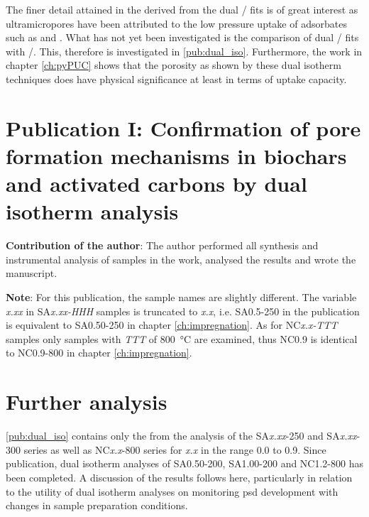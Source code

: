 The finer detail attained in the derived  from the dual / fits is of great interest as \glspl{ultramicropore} have been attributed to the low pressure uptake of \glspl{adsorbate} such as  and .\citep{Presser2011Effect, Sevilla2014Energy, Cabria2007optimum, DelaCasaLillo2002Hydrogen, Masika2012Hydrogen} What has not yet been investigated is the comparison of dual / fits with /. This, therefore is investigated in \ref{pub:dual_iso}. Furthermore, the work in chapter \ref{ch:pyPUC} shows that the porosity as shown by these dual isotherm techniques does have physical significance at least in terms of  uptake capacity.
%
\newpage
\section[Publication I]{Publication I: Confirmation of pore formation mechanisms in biochars and activated carbons by dual isotherm analysis}

\textbf{Contribution of the author}: The author performed all synthesis and instrumental analysis of samples in the work, analysed the results and wrote the manuscript.

\textbf{Note}: For this publication, the sample names are slightly different. The variable \textit{x.xx} in SA\textit{x.xx-HHH} samples is truncated to \textit{x.x}, i.e. SA0.5-250 in the publication is equivalent to SA0.50-250 in chapter \ref{ch:impregnation}. As for NC\textit{x.x-TTT} samples only samples with \textit{TTT} of \qty{800}{\degreeCelsius} are examined, thus NC0.9 is identical to NC0.9-800 in chapter \ref{ch:impregnation}.  

\setcounter{opagenum}{\thepage}
\newpage

\setlength{\originalVOffset}{\voffset}   
\setlength{\originalHOffset}{\hoffset}

\setlength{\voffset}{0cm}
\setlength{\hoffset}{0cm}

\setlength{\voffset}{\originalVOffset}
\setlength{\hoffset}{\originalHOffset}

\newpage
\section{Further analysis}
\ref{pub:dual_iso} contains only the  from the analysis of the SA\textit{x.xx}-250 and SA\textit{x.xx}-300 series as well as NC\textit{x.x}-800 series for \textit{x.x} in the range 0.0 to 0.9. Since publication, dual isotherm analyses of SA0.50-200, SA1.00-200 and NC1.2-800 has been completed. A discussion of the results follows here, particularly in relation to the utility of dual isotherm analyses on monitoring \acrshort{psd} development with changes in sample preparation conditions.

